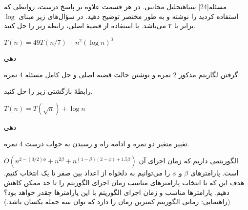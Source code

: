 ‌مسئله[24] ‌سیاه{تحلیل مجانبی}. در هر قسمت علاوه بر پاسخ درست، روابطی که استفاده کردید را نوشته و به طور مختصر توضیح دهید.
در سؤال‌های زیر مبنای $\log$ برابر با ۲ می‌باشد.
با استفاده از قضیۀ اصلی، رابطۀ زیر را حل کنید.
\begin{center}
	$T(n) = 49 T(n/7) + n^2 (\log n)^3$
\end{center}

‌دهی{
	گرفتن لگاریتم مذکور 2 نمره و نوشتن حالت قضیه اصلی و حل کامل مسئله 4 نمره. 
	
}


 رابطۀ بازگشتی زیر را حل کنید.
\begin{center}
$T(n)=T(\sqrt{n}) + \log n$
\end{center}

‌دهی{
	
	
	تغییر متغیر دو نمره و ادامه راه و رسیدن به جواب درست 4 نمره. 
	
}



الگوریتمی داریم که زمان اجرای آن
$O(n^{2-(3/2)\phi} + n^{2\beta} + n^{(1-\beta)(2-\phi)+1.5\beta})$
است. پارامترهای $\beta$ و $\phi$ را می‌توانیم به دلخواه از اعداد بین صفر تا یک انتخاب کنیم. هدف این که با انتخاب پارامترهای مناسب زمان اجرای الگوریتم را تا حد ممکن کاهش دهیم. پارامترها مناسب و زمان اجرای الگوریتم با این پارامترها چقدر خواهد بود؟ (راهنمایی: زمانی الگوریتم کمترین زمان را دارد که توان سه جمله یکسان باشد.)


